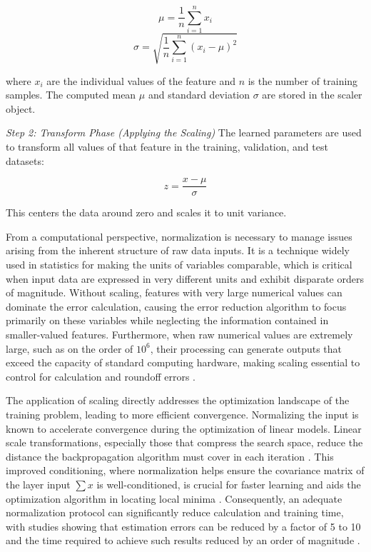 \begin{equation}
	\mu = \frac{1}{n} \sum_{i=1}^{n} x_i
\end{equation}
\begin{equation}
	\sigma = \sqrt{\frac{1}{n} \sum_{i=1}^{n} (x_i - \mu)^2}
\end{equation}

where \(x_i\) are the individual values of the feature and \(n\) is the number of training samples. The computed mean \(\mu\) and standard deviation \(\sigma\) are stored in the scaler object.

\textit{Step 2: Transform Phase (Applying the Scaling)}
The learned parameters are used to transform all values of that feature in the training, validation, and test datasets:

\begin{equation}
	z = \frac{x - \mu}{\sigma}
\end{equation}

This centers the data around zero and scales it to unit variance.

From a computational perspective, normalization is necessary to manage issues arising from the inherent structure of raw data inputs. It is a technique widely used in statistics for making the units of variables comparable, which is critical when input data are expressed in very different units and exhibit disparate orders of magnitude. Without scaling, features with very large numerical values can dominate the error calculation, causing the error reduction algorithm to focus primarily on these variables while neglecting the information contained in smaller-valued features. Furthermore, when raw numerical values are extremely large, such as on the order of $10^{6}$, their processing can generate outputs that exceed the capacity of standard computing hardware, making scaling essential to control for calculation and roundoff errors \parencite{shanker1996effectdatastandardization}.

The application of scaling directly addresses the optimization landscape of the training problem, leading to more efficient convergence. Normalizing the input is known to accelerate convergence during the optimization of linear models. Linear scale transformations, especially those that compress the search space, reduce the distance the backpropagation algorithm must cover in each iteration \parencite{sola1997importancedatanormalization}. This improved conditioning, where normalization helps ensure the covariance matrix of the layer input $\sum{}x$ is well-conditioned, is crucial for faster learning and aids the optimization algorithm in locating local minima \parencite{huang2020normalizationtechniquestrainingdnns}. Consequently, an adequate normalization protocol can significantly reduce calculation and training time, with studies showing that estimation errors can be reduced by a factor of 5 to 10 and the time required to achieve such results reduced by an order of magnitude \parencite{sola1997importancedatanormalization}.

